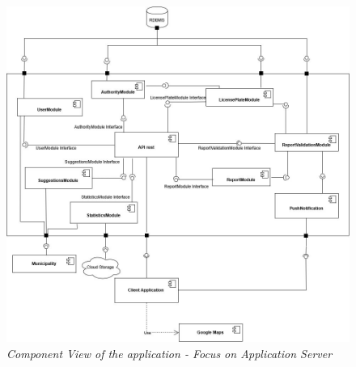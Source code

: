 \begin{figure}[H]
  \centering
  \includegraphics[width=\textwidth]{DD_Images/ComponentView/componentViewServerZoom.jpg}
  \caption{\textit{Component View of the application - Focus on Application Server}}
\end{figure}

